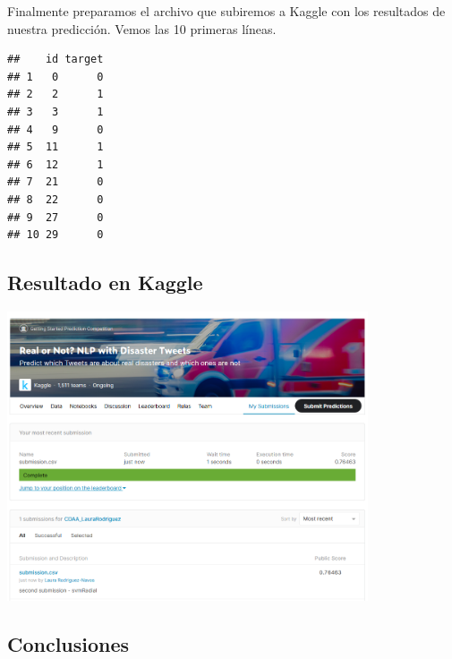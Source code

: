 \documentclass[]{article}
\newenvironment{Shaded}{\begin{snugshade}}{\end{snugshade}}
\newcommand{\DataTypeTok}[1]{\textcolor[rgb]{0.13,0.29,0.53}{#1}}
\newcommand{\DecValTok}[1]{\textcolor[rgb]{0.00,0.00,0.81}{#1}}
\newcommand{\KeywordTok}[1]{\textcolor[rgb]{0.13,0.29,0.53}{\textbf{#1}}}
\newcommand{\NormalTok}[1]{#1}
\newcommand{\OperatorTok}[1]{\textcolor[rgb]{0.81,0.36,0.00}{\textbf{#1}}}
\newcommand{\OtherTok}[1]{\textcolor[rgb]{0.56,0.35,0.01}{#1}}
\newcommand{\StringTok}[1]{\textcolor[rgb]{0.31,0.60,0.02}{#1}}
\begin{document}
Finalmente preparamos el archivo que subiremos a Kaggle con los
resultados de nuestra predicción. Vemos las 10 primeras líneas.

\begin{Shaded}
\end{Shaded}

\begin{verbatim}
##    id target
## 1   0      0
## 2   2      1
## 3   3      1
## 4   9      0
## 5  11      1
## 6  12      1
## 7  21      0
## 8  22      0
## 9  27      0
## 10 29      0
\end{verbatim}

\hypertarget{resultado-en-kaggle}{%
\subsection{Resultado en Kaggle}\label{resultado-en-kaggle}}

\includegraphics[width=0.8\textwidth,height=\textheight]{submission.png}

\hypertarget{conclusiones}{%
\subsection{Conclusiones}\label{conclusiones}}
\end{document}
